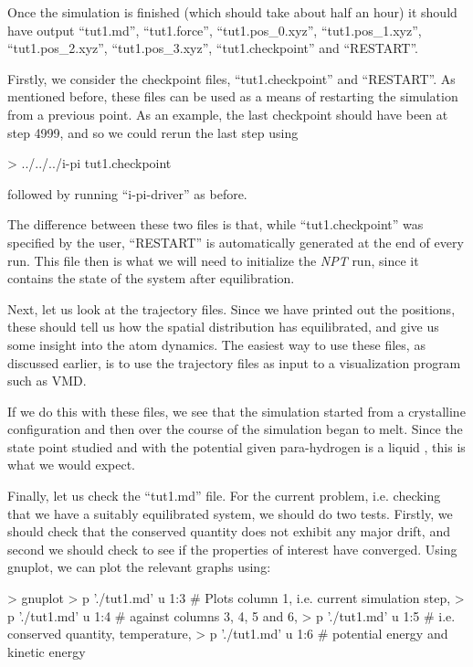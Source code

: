 \documentclass[11pt,english,fleqn]{report}
\newenvironment{code}{%
\footnotesize 
\verbatim
}{
\endverbatim
\normalsize
}
\begin{document}
Once the simulation is finished (which should take about half an hour)
it should have output {}``tut1.md'', {}``tut1.force'', {}``tut1.pos\_0.xyz'',
{}``tut1.pos\_1.xyz'', {}``tut1.pos\_2.xyz'', {}``tut1.pos\_3.xyz'',
{}``tut1.checkpoint'' and {}``RESTART''.

Firstly, we consider the checkpoint files, 
{}``tut1.checkpoint'' and {}``RESTART''.
As mentioned before, these files can be used as a means of restarting
the simulation from a previous point. As an example, the last
checkpoint should have been at step 4999, and so we could rerun
the last step using
\begin{code}
> ../../../i-pi tut1.checkpoint
\end{code}
followed by running {}``i-pi-driver'' as before.

The difference between these two files is that, while {}``tut1.checkpoint''
was specified by the user, {}``RESTART'' is automatically generated at the
end of every \ipi run. This file then is what we will need to initialize the
\emph{NPT} run, since it contains the state of the system after
equilibration.

Next, let us look at the trajectory files. Since we have printed out
the positions, these should tell us how the spatial distribution
has equilibrated, and give us some insight into the atom dynamics.
The easiest way to use these files, as discussed earlier, is to
use the trajectory files as input to a visualization program such as VMD.

If we do this with these files, we see that the simulation started
from a crystalline configuration and then over the course
of the simulation began to melt. Since the state point studied
and with the potential given para-hydrogen is a liquid \cite{silv-gold78jcp},
this is what we would expect.

Finally, let us check the {}``tut1.md'' file. For the current
problem, i.e. checking that we have a suitably equilibrated system,
we should do two tests. Firstly,
we should check that the conserved quantity does not exhibit any major
drift, and second we should check to see if the properties of interest
have converged. Using gnuplot, we can plot the relevant graphs using:

\begin{code}
> gnuplot
> p './tut1.md' u 1:3 # Plots column 1, i.e. current simulation step, 
> p './tut1.md' u 1:4 # against columns 3, 4, 5 and 6,
> p './tut1.md' u 1:5 # i.e. conserved quantity, temperature,
> p './tut1.md' u 1:6 # potential energy and kinetic energy
\end{code}
\end{document}

